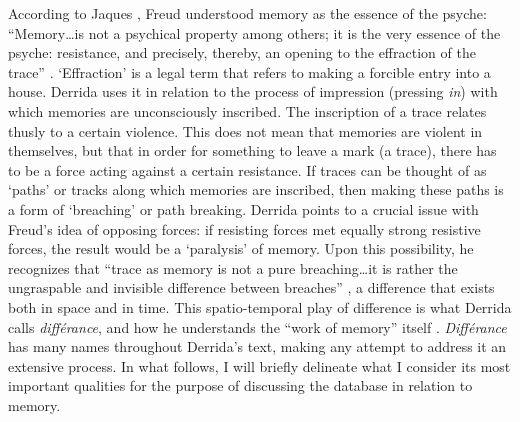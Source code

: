 
According to Jaques \textcite{Der78:Wri}, Freud understood memory as the essence of the psyche: ``Memory\dots is not a psychical property among others; it is the very essence of the psyche: resistance, and precisely, thereby, an opening to the effraction of the trace'' \parencite[201]{Der78:Wri}. `Effraction' is a legal term that refers to making a forcible entry into a house. Derrida uses it in relation to the process of impression (pressing \textit{in}) with which memories are unconsciously inscribed. The inscription of a trace relates thusly to a certain violence. This does not mean that memories are violent in themselves, but that in order for something to leave a mark (a trace), there has to be a force acting against a certain resistance. If traces can be thought of as `paths' or tracks along which memories are inscribed, then making these paths is a form of `breaching' or path breaking. Derrida points to a crucial issue with Freud's idea of opposing forces: if resisting forces met equally strong resistive forces, the result would be a `paralysis' of memory. Upon this possibility, he recognizes that ``trace as memory is not a pure breaching\dots it is rather the ungraspable and invisible difference between breaches'' \parencite[201]{Der78:Wri}, a difference that exists both in space and in time. This spatio-temporal play of difference is what Derrida calls \textit{différance}, and how he understands the ``work of memory'' itself \parencite[226]{Der78:Wri}. \textit{Différance} has many names throughout Derrida's text, making any attempt to address it an extensive process. In what follows, I will briefly delineate what I consider its most important qualities for the purpose of discussing the database in relation to memory.

